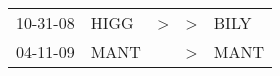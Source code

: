 \begin{supertabular}{p{0.07\textwidth}p{0.06\textwidth}p{0.02\textwidth}p{0.02\textwidth}p{0.06\textwidth}}
 10-31-08\textsuperscript{} &  HIGG\textsuperscript{} &  \textgreater &  \textgreater &  BILY\textsuperscript{} \\
 04-11-09\textsuperscript{} &  MANT\textsuperscript{} &               &  \textgreater &  MANT\textsuperscript{} \\
\end{supertabular}
